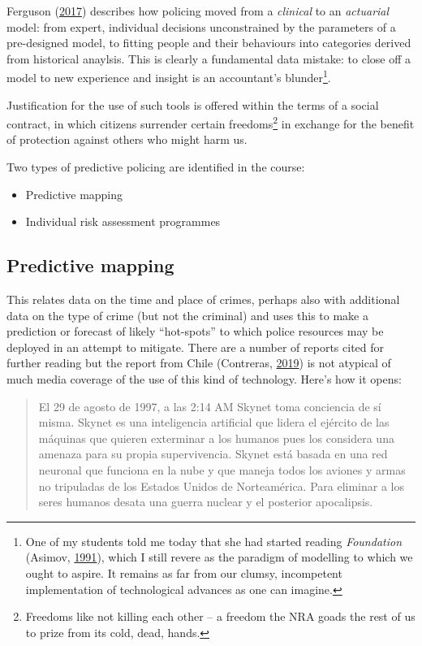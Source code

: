 \documentclass[
]{book}
\providecommand{\tightlist}{%
  \setlength{\itemsep}{0pt}\setlength{\parskip}{0pt}}
\begin{document}
Ferguson (\protect\hyperlink{ref-Ferguson2017}{2017}) describes how policing moved from a \emph{clinical} to an \emph{actuarial} model: from expert, individual decisions unconstrained by the parameters of a pre-designed model, to fitting people and their behaviours into categories derived from historical anaylsis. This is clearly a fundamental data mistake: to close off a model to new experience and insight is an accountant's blunder\footnote{One of my students told me today that she had started reading \emph{Foundation} (Asimov, \protect\hyperlink{ref-asimov1991foundation}{1991}), which I still revere as the paradigm of modelling to which we ought to aspire. It remains as far from our clumsy, incompetent implementation of technological advances as one can imagine.}.

Justification for the use of such tools is offered within the terms of a social contract, in which citizens surrender certain freedoms\footnote{Freedoms like not killing each other -- a freedom the NRA goads the rest of us to prize from its cold, dead, hands.} in exchange for the benefit of protection against others who might harm us.

Two types of predictive policing are identified in the course:

\begin{itemize}
\tightlist
\item
  Predictive mapping
\item
  Individual risk assessment programmes
\end{itemize}

\hypertarget{predictive-mapping}{%
\subsection{Predictive mapping}\label{predictive-mapping}}

This relates data on the time and place of crimes, perhaps also with additional data on the type of crime (but not the criminal) and uses this to make a prediction or forecast of likely ``hot-spots'' to which police resources may be deployed in an attempt to mitigate. There are a number of reports cited for further reading but the report from Chile (Contreras, \protect\hyperlink{ref-Contreras2019}{2019}) is not atypical of much media coverage of the use of this kind of technology. Here's how it opens:

\begin{quote}
El 29 de agosto de 1997, a las 2:14 AM Skynet toma conciencia de sí misma. Skynet es una inteligencia artificial que lidera el ejército de las máquinas que quieren exterminar a los humanos pues los considera una amenaza para su propia supervivencia. Skynet está basada en una red neuronal que funciona en la nube y que maneja todos los aviones y armas no tripuladas de los Estados Unidos de Norteamérica. Para eliminar a los seres humanos desata una guerra nuclear y el posterior apocalipsis.
\end{quote}
\end{document}
